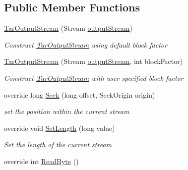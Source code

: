 \subsection*{Public Member Functions}
\begin{DoxyCompactItemize}
\item 
\hyperlink{class_i_c_sharp_code_1_1_sharp_zip_lib_1_1_tar_1_1_tar_output_stream_a9c324e179a9735fd0c3c128bbc704c7c}{Tar\+Output\+Stream} (Stream \hyperlink{class_i_c_sharp_code_1_1_sharp_zip_lib_1_1_tar_1_1_tar_output_stream_a521e429618eb86a1a31242ec2d8e92b0}{output\+Stream})
\begin{DoxyCompactList}\small\item\em Construct \hyperlink{class_i_c_sharp_code_1_1_sharp_zip_lib_1_1_tar_1_1_tar_output_stream}{Tar\+Output\+Stream} using default block factor \end{DoxyCompactList}\item 
\hyperlink{class_i_c_sharp_code_1_1_sharp_zip_lib_1_1_tar_1_1_tar_output_stream_abb7670065482af0ce4f4be9c0d588a15}{Tar\+Output\+Stream} (Stream \hyperlink{class_i_c_sharp_code_1_1_sharp_zip_lib_1_1_tar_1_1_tar_output_stream_a521e429618eb86a1a31242ec2d8e92b0}{output\+Stream}, int block\+Factor)
\begin{DoxyCompactList}\small\item\em Construct \hyperlink{class_i_c_sharp_code_1_1_sharp_zip_lib_1_1_tar_1_1_tar_output_stream}{Tar\+Output\+Stream} with user specified block factor \end{DoxyCompactList}\item 
override long \hyperlink{class_i_c_sharp_code_1_1_sharp_zip_lib_1_1_tar_1_1_tar_output_stream_a2c48071309528497f553f5b015503802}{Seek} (long offset, Seek\+Origin origin)
\begin{DoxyCompactList}\small\item\em set the position within the current stream \end{DoxyCompactList}\item 
override void \hyperlink{class_i_c_sharp_code_1_1_sharp_zip_lib_1_1_tar_1_1_tar_output_stream_adc151653b44969093b2cfb6fd4cd6048}{Set\+Length} (long value)
\begin{DoxyCompactList}\small\item\em Set the length of the current stream \end{DoxyCompactList}\item 
override int \hyperlink{class_i_c_sharp_code_1_1_sharp_zip_lib_1_1_tar_1_1_tar_output_stream_a3c252230a5bc39942e0417219dd732e6}{Read\+Byte} ()

\end{DoxyCompactItemize}
